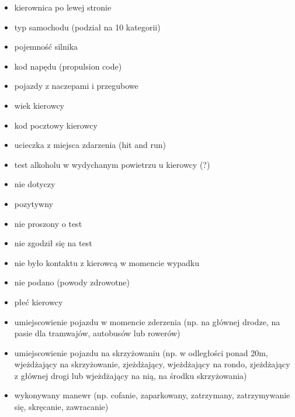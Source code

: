 \begin{itemize}
\itemsep-14pt\parskip0pt
\item
  kierownica po lewej stronie\\
\item
  typ samochodu (podział na 10 kategorii)\\
\item
  pojemność silnika\\
\item
  kod napędu (propulsion code)\\
\item
  pojazdy z naczepami i przegubowe\\
\item
  wiek kierowcy\\
\item
  kod pocztowy kierowcy\\
\item
  ucieczka z miejsca zdarzenia (hit and run)\\
\item
  test alkoholu w wydychanym powietrzu u kierowcy (?)\\
\item
  nie dotyczy\\
\item
  pozytywny\\
\item
  nie proszony o test\\
\item
  nie zgodził się na test\\
\item
  nie było kontaktu z kierowcą w momencie wypadku\\
\item
  nie podano (powody zdrowotne)\\
\item
  płeć kierowcy\\
\item
  umiejscowienie pojazdu w momencie zderzenia (np. na głównej drodze, na
  pasie dla tramwajów, autobusów lub rowerów)\\
\item
  umiejscowienie pojazdu na skrzyżowaniu (np. w odległości ponad 20m,
  wjeżdżający na skrzyżowanie, zjeżdżający, wjeżdżający na rondo,
  zjeżdżający z głównej drogi lub wjeżdżający na nią, na środku
  skrzyżowania)\\
\item
  wykonywany manewr (np. cofanie, zaparkowany, zatrzymany, zatrzymywanie
  się, skręcanie, zawracanie)\\

\end{itemize}
